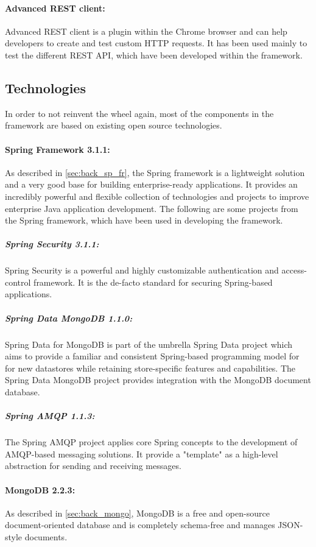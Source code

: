 \paragraph{Advanced REST client:\label{sec:impl_advanced_rest_cl}} Advanced REST client is a plugin within the Chrome browser and can help developers to create and test custom HTTP requests. It has been used mainly to test the different REST API, which have been developed within the framework.

\subsection{Technologies\label{sec:impl_technologies}}
In order to not reinvent the wheel again, most of the components in the framework are based on existing open source technologies. 

\paragraph{Spring Framework 3.1.1:\label{sec:impl_spring}} As described in \ref{sec:back_sp_fr}, the Spring framework is a lightweight solution and a very good base for building enterprise-ready applications. It provides an incredibly powerful and flexible collection of technologies and projects to improve enterprise Java application development. The following are some projects from the Spring framework, which have been used in developing the framework.

\subparagraph{Spring Security 3.1.1:\label{sec:impl_spring_sec}} Spring Security is a powerful and highly customizable authentication and access-control framework. It is the de-facto standard for securing Spring-based applications.

\subparagraph{Spring Data MongoDB 1.1.0:\label{sec:impl_spring_data}} Spring Data for MongoDB is part of the umbrella Spring Data project which aims to provide a familiar and consistent Spring-based programming model for for new datastores while retaining store-specific features and capabilities. The Spring Data MongoDB project provides integration with the MongoDB document database.

\subparagraph{Spring AMQP 1.1.3:\label{sec:impl_spring_amqp}} The Spring AMQP project applies core Spring concepts to the development of AMQP-based messaging solutions. It provide a "template" as a high-level abstraction for sending and receiving messages.

\paragraph{MongoDB 2.2.3:\label{sec:impl_mongo}} As described in \ref{sec:back_mongo}, MongoDB is a free and open-source document-oriented database and is completely schema-free and manages JSON-style documents.

